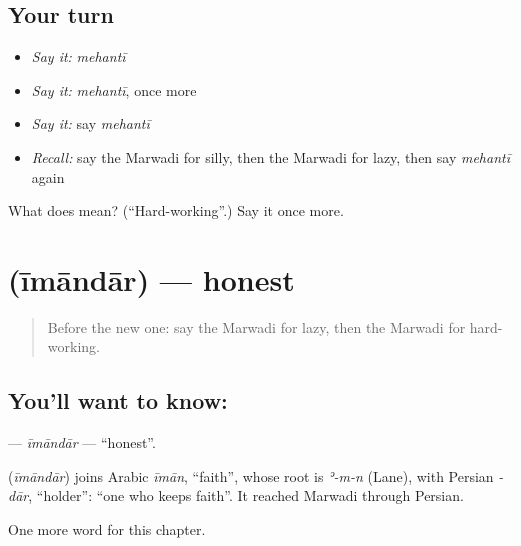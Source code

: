 \subsection*{Your turn}
\begin{itemize}
\raggedright
  \item \emph{Say it:} \emph{mehantī}
  \item \emph{Say it:} \emph{mehantī}, once more
  \item \emph{Say it:} say \emph{mehantī}
  \item \emph{Recall:} say the Marwadi for silly, then the Marwadi for lazy, then say \emph{mehantī} again
\end{itemize}

\begin{tcolorbox}[breakable,colback=teal!4,colframe=teal!35!black,title={Before you move on}]
What does  mean? (\textquotedblleft{}Hard-working\textquotedblright{}.) Say it once more.
\end{tcolorbox}
\section[\texorpdfstring{\mw{ईमानदार} (īmāndār)}{ईमानदार (īmāndār)}]{ (īmāndār) — honest}

\label{lesson:MW-C147-imandar}



\begin{quote}
Before the new one: say the Marwadi for lazy, then the Marwadi for hard-working.
\end{quote}

\subsection*{You'll want to know: }
\textbf{} — \emph{īmāndār} — \textquotedblleft{}honest\textquotedblright{}.

\begin{cousinweb}
\textbf{} (\emph{īmāndār}) joins Arabic \emph{īmān}, \textquotedblleft{}faith\textquotedblright{}, whose root is \emph{ʾ-m-n} (Lane), with Persian \emph{-dār}, \textquotedblleft{}holder\textquotedblright{}: \textquotedblleft{}one who keeps faith\textquotedblright{}. It reached Marwadi through Persian.
\end{cousinweb}

\begin{grammarlens}[title={What you've built}]
One more word for this chapter.
\end{grammarlens}

